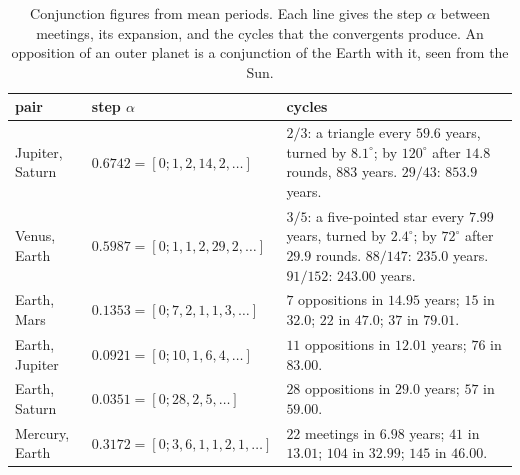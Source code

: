 \begin{table}[ht]
\centering
\caption{Conjunction figures from mean periods. Each line gives the step $\alpha$ between meetings, its
expansion, and the cycles that the convergents produce. An opposition of an outer planet is a conjunction
of the Earth with it, seen from the Sun.}\label{tab:18conj}
\small
\begin{tabular}{llp{}}
\hline
pair & step $\alpha$ & cycles\\
\hline
Jupiter, Saturn & $0.6742=[0;1,2,14,2,\ldots]$ & $2/3$: a triangle every $59.6$ years, turned by
$8.1^{\circ}$; by $120^{\circ}$ after $14.8$ rounds, $883$ years. $29/43$: $853.9$ years.\\
Venus, Earth & $0.5987=[0;1,1,2,29,2,\ldots]$ & $3/5$: a five-pointed star every $7.99$ years, turned
by $2.4^{\circ}$; by $72^{\circ}$ after $29.9$ rounds. $88/147$: $235.0$ years. $91/152$: $243.00$ years.\\
Earth, Mars & $0.1353=[0;7,2,1,1,3,\ldots]$ & $7$ oppositions in $14.95$ years; $15$ in $32.0$; $22$ in
$47.0$; $37$ in $79.01$.\\
Earth, Jupiter & $0.0921=[0;10,1,6,4,\ldots]$ & $11$ oppositions in $12.01$ years; $76$ in $83.00$.\\
Earth, Saturn & $0.0351=[0;28,2,5,\ldots]$ & $28$ oppositions in $29.0$ years; $57$ in $59.00$.\\
Mercury, Earth & $0.3172=[0;3,6,1,1,2,1,\ldots]$ & $22$ meetings in $6.98$ years; $41$ in $13.01$; $104$
in $32.99$; $145$ in $46.00$.\\
\hline
\end{tabular}
\end{table}

